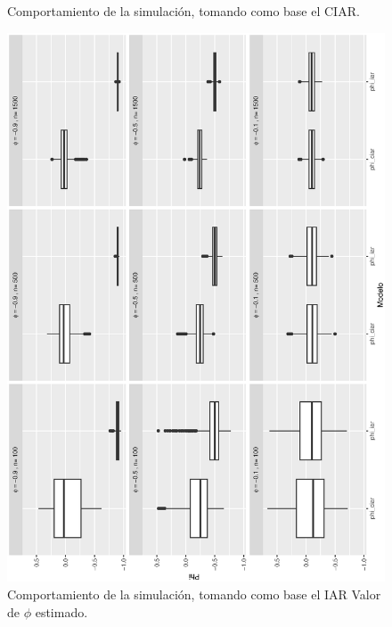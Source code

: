 \begin{figure}[h]
\begin{minipage}{0.45\textwidth}
    \caption{Comportamiento de la simulación, tomando como base el CIAR.}
    \label{fig:ciarvsiar}
    \end{minipage}
\end{figure}

\begin{figure}[h]
    \begin{minipage}{0.45\textwidth}
    \includegraphics[width=0.75\linewidth,angle = 270]{Kap3/Fig_Cap3/sim4_IARvsCIARphi.eps}
    \caption{Comportamiento de la simulación, tomando como base el IAR Valor de $\phi$ estimado.}
    \label{fig:iarvsciarphi}
    \end{minipage}
    \hfill
    \begin{minipage}{0.45\textwidth}

\end{minipage}
\end{figure}
